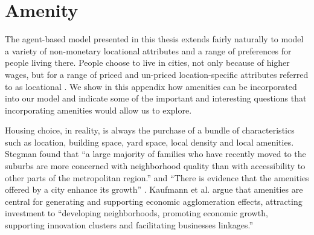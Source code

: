 \chapter{Amenity}\label{chapter-amenity}

The agent-based model presented in this thesis extends fairly naturally to model a variety of non-monetary locational attributes and a range of preferences for people living there. People choose to live in cities, not only because of higher wages, but for a range of priced and un-priced location-specific attributes referred to as locational .  We show in this appendix how amenities can be incorporated into our model and indicate some of the important and interesting questions that incorporating amenities would allow us to explore.



Housing choice, in reality, is always the purchase of a bundle of characteristics such as location, building space, yard space, local density and local amenities. %
Stegman \cite{stegmanAccessibilityModelsResidential1969a} found that ``a large majority of families who have recently moved to the suburbs are more concerned with neighborhood quality than with accessibility to other parts of the metropolitan region.''  and ``There is evidence that the amenities offered by a city enhance its growth'' \cite{clarkAmenitiesDriveUrban2002, falckPhantomOperaCultural2011}. 
Kaufmann et al. \cite{kaufmannScalingUrbanAmenities2022} 
argue that amenities are central for generating and supporting economic agglomeration effects, attracting investment to ``developing neighborhoods, promoting economic growth, supporting innovation clusters and facilitating businesses linkages.''



